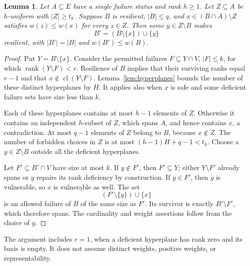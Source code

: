 \documentclass[11pt]{article}
\newtheorem{lemma}[theorem]{Lemma}
\theoremstyle{definition}\newtheorem{definition}[theorem]{Definition}
\theoremstyle{remark}\newtheorem{remark}[theorem]{Remark}
\DeclareMathOperator{\rk}{rank}
\DeclareMathOperator{\cl}{cl}
\begin{document}
\begin{lemma}\label{lem:exchange}
Let $A\subseteq E$ have a single failure status and rank $h\geq1$. Let $Z\subseteq A$ be $h$-uniform with $|Z|\geq t_h$. Suppose $B$ is resilient, $|B|\leq q$, and $x\in(B\cap A)\setminus Z$ satisfies $w(z)\leq w(x)$ for every $z\in Z$. Then some $y\in Z\setminus B$ makes
\[
 B'=(B\setminus\{x\})\cup\{y\}
\]
resilient, with $|B'|=|B|$ and $w(B')\leq w(B)$.
\end{lemma}
\begin{proof}
Put $Y=B\setminus\{x\}$. Consider the permitted failures $F\subseteq Y\cap V$, $|F|\leq k$, for which $\rk(Y\setminus F)<r$. Resilience of $B$ implies that their surviving ranks equal $r-1$ and that $x\notin\cl(Y\setminus F)$. Lemma~\ref{lem:hyperplanes} bounds the number of these distinct hyperplanes by $H$. It applies also when $x$ is safe and some deficient failure sets have size less than $k$.

Each of these hyperplanes contains at most $h-1$ elements of $Z$. Otherwise it contains an independent $h$-subset of $Z$, which spans $A$, and hence contains $x$, a contradiction. At most $q-1$ elements of $Z$ belong to $B$, because $x\notin Z$. The number of forbidden choices in $Z$ is at most $(h-1)H+q-1<t_h$. Choose a $y\in Z\setminus B$ outside all the deficient hyperplanes.

Let $F'\subseteq B'\cap V$ have size at most $k$. If $y\notin F'$, then $F'\subseteq Y$; either $Y\setminus F'$ already spans or $y$ repairs its rank deficiency by construction. If $y\in F'$, then $y$ is vulnerable, so $x$ is vulnerable as well. The set
\[
 (F'\setminus\{y\})\cup\{x\}
\]
is an allowed failure of $B$ of the same size as $F'$. Its survivor is exactly $B'\setminus F'$, which therefore spans. The cardinality and weight assertions follow from the choice of $y$.
\end{proof}

The argument includes $r=1$, when a deficient hyperplane has rank zero and its basis is empty. It does not assume distinct weights, positive weights, or representability.
\end{document}
